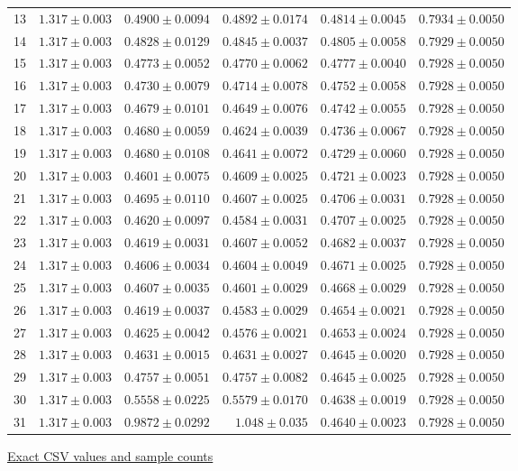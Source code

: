 \begin{center}
{\begin{tabular}{lrrrrr}
13 & $1.317\pm0.003$ & $0.4900\pm0.0094$ & $0.4892\pm0.0174$ & $0.4814\pm0.0045$ & $0.7934\pm0.0050$ \\
14 & $1.317\pm0.003$ & $0.4828\pm0.0129$ & $0.4845\pm0.0037$ & $0.4805\pm0.0058$ & $0.7929\pm0.0050$ \\
15 & $1.317\pm0.003$ & $0.4773\pm0.0052$ & $0.4770\pm0.0062$ & $0.4777\pm0.0040$ & $0.7928\pm0.0050$ \\
16 & $1.317\pm0.003$ & $0.4730\pm0.0079$ & $0.4714\pm0.0078$ & $0.4752\pm0.0058$ & $0.7928\pm0.0050$ \\
17 & $1.317\pm0.003$ & $0.4679\pm0.0101$ & $0.4649\pm0.0076$ & $0.4742\pm0.0055$ & $0.7928\pm0.0050$ \\
18 & $1.317\pm0.003$ & $0.4680\pm0.0059$ & $0.4624\pm0.0039$ & $0.4736\pm0.0067$ & $0.7928\pm0.0050$ \\
19 & $1.317\pm0.003$ & $0.4680\pm0.0108$ & $0.4641\pm0.0072$ & $0.4729\pm0.0060$ & $0.7928\pm0.0050$ \\
20 & $1.317\pm0.003$ & $0.4601\pm0.0075$ & $0.4609\pm0.0025$ & $0.4721\pm0.0023$ & $0.7928\pm0.0050$ \\
21 & $1.317\pm0.003$ & $0.4695\pm0.0110$ & $0.4607\pm0.0025$ & $0.4706\pm0.0031$ & $0.7928\pm0.0050$ \\
22 & $1.317\pm0.003$ & $0.4620\pm0.0097$ & $0.4584\pm0.0031$ & $0.4707\pm0.0025$ & $0.7928\pm0.0050$ \\
23 & $1.317\pm0.003$ & $0.4619\pm0.0031$ & $0.4607\pm0.0052$ & $0.4682\pm0.0037$ & $0.7928\pm0.0050$ \\
24 & $1.317\pm0.003$ & $0.4606\pm0.0034$ & $0.4604\pm0.0049$ & $0.4671\pm0.0025$ & $0.7928\pm0.0050$ \\
25 & $1.317\pm0.003$ & $0.4607\pm0.0035$ & $0.4601\pm0.0029$ & $0.4668\pm0.0029$ & $0.7928\pm0.0050$ \\
26 & $1.317\pm0.003$ & $0.4619\pm0.0037$ & $0.4583\pm0.0029$ & $0.4654\pm0.0021$ & $0.7928\pm0.0050$ \\
27 & $1.317\pm0.003$ & $0.4625\pm0.0042$ & $0.4576\pm0.0021$ & $0.4653\pm0.0024$ & $0.7928\pm0.0050$ \\
28 & $1.317\pm0.003$ & $0.4631\pm0.0015$ & $0.4631\pm0.0027$ & $0.4645\pm0.0020$ & $0.7928\pm0.0050$ \\
29 & $1.317\pm0.003$ & $0.4757\pm0.0051$ & $0.4757\pm0.0082$ & $0.4645\pm0.0025$ & $0.7928\pm0.0050$ \\
30 & $1.317\pm0.003$ & $0.5558\pm0.0225$ & $0.5579\pm0.0170$ & $0.4638\pm0.0019$ & $0.7928\pm0.0050$ \\
31 & $1.317\pm0.003$ & $0.9872\pm0.0292$ & $1.048\pm0.035$ & $0.4640\pm0.0023$ & $0.7928\pm0.0050$ \\
\bottomrule\end{tabular}}
{\footnotesize\href{https://github.com/sanjeevkrishnaa/Compiler-Driven-ACE/blob/codex/ace-scheduler-correctness/docs/latex/qft96_final/data/allocation_torus_dijkstra_m32.csv}{Exact CSV values and sample counts}}
\end{center}